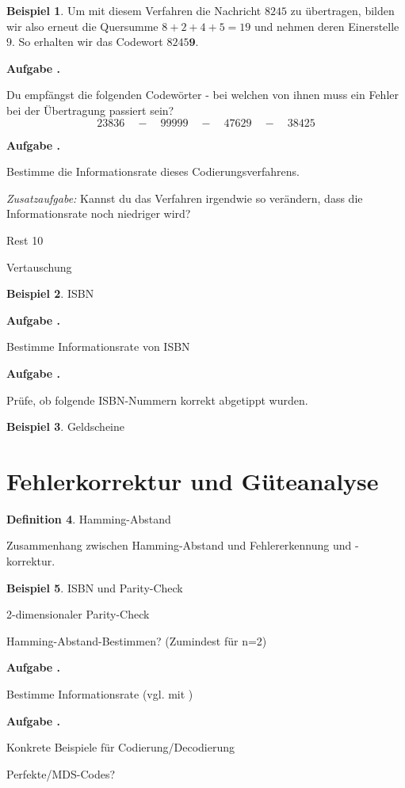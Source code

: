 \documentclass[a4paper,ngerman,12pt]{scrartcl}
\theoremstyle{definition}
\newtheorem{defn}{Definition}[]
\newtheorem{bsp}[defn]{Beispiel}
\theoremstyle{plain}
\theoremstyle{remark}
\newlength{\aufgabenskip}
\newcounter{aufgabennummer}
\newenvironment{aufgabe}[1]{
	\addtocounter{aufgabennummer}{1}
	\textbf{Aufgabe \theaufgabennummer.} \emph{#1} \par
}{\vspace{\aufgabenskip}}
\begin{document}
\begin{bsp}
	Um mit diesem Verfahren die Nachricht $8245$ zu übertragen, bilden wir also erneut die Quersumme $8+2+4+5=19$ und nehmen deren Einerstelle $9$. So erhalten wir das Codewort $8245\textbf{9}$.
\end{bsp}

\begin{aufgabe}{}
	Du empfängst die folgenden Codewörter - bei welchen von ihnen muss ein Fehler bei der Übertragung passiert sein?
		\[23836 \quad-\quad 99999 \quad-\quad 47629 \quad-\quad 38425\]
\end{aufgabe}

\begin{aufgabe}{}
	Bestimme die Informationsrate dieses Codierungsverfahrens.

	\emph{Zusatzaufgabe:} Kannst du das Verfahren irgendwie so verändern, dass die Informationsrate noch niedriger wird?
\end{aufgabe}


Rest 10

Vertauschung

\begin{bsp}
	ISBN
\end{bsp}

\begin{aufgabe}{}
	Bestimme Informationsrate von ISBN
\end{aufgabe}

\begin{aufgabe}{}
	Prüfe, ob folgende ISBN-Nummern korrekt abgetippt wurden.
\end{aufgabe}

\begin{bsp}
	Geldscheine
\end{bsp}


\section{Fehlerkorrektur und Güteanalyse}

\begin{defn}
	Hamming-Abstand
\end{defn}

Zusammenhang zwischen Hamming-Abstand und Fehlererkennung und -korrektur.

\begin{bsp}
	ISBN und Parity-Check
\end{bsp}

2-dimensionaler Parity-Check

Hamming-Abstand-Bestimmen? (Zumindest für n=2)

\begin{aufgabe}{}
	Bestimme Informationsrate (vgl. mit )
\end{aufgabe}

\begin{aufgabe}{}
	Konkrete Beispiele für Codierung/Decodierung
\end{aufgabe}

Perfekte/MDS-Codes?
\end{document}
